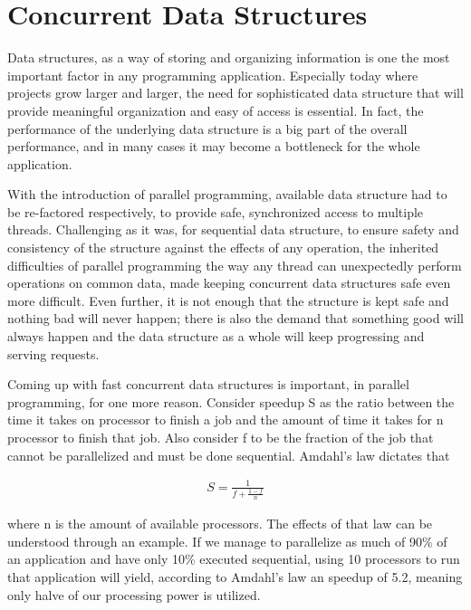 \section{Concurrent Data Structures}

Data structures, as a way of storing and organizing information is one the most important factor in any programming application. Especially today where projects grow larger and larger, the need for sophisticated data structure that will provide meaningful organization and easy of access is essential. In fact, the performance of the underlying data structure is a big part of the overall performance, and in many cases it may become a bottleneck for the whole application.

With the introduction of parallel programming,  available data structure had to be re-factored respectively, to provide safe, synchronized access to multiple threads. Challenging as it was, for sequential data structure, to ensure safety and consistency of the structure against the effects of any operation, the inherited difficulties of parallel programming the way any thread can unexpectedly perform operations on common data, made keeping concurrent data structures safe even more difficult. Even further, it is not enough that the structure is kept safe and nothing bad will never happen; there is also the demand that something good will always happen and the data structure as a whole will keep progressing and serving requests. 

Coming up with fast concurrent data structures is  important, in parallel programming, for one more reason. Consider speedup S as the ratio between the time it takes on processor to finish a job and the amount of time it takes for n processor to finish that job. Also consider f to be the fraction of the job  that cannot be parallelized and must be done sequential. Amdahl's law dictates that 

\begin{align*}
	S = \frac{1}{f + \frac{1-f}{n}}
\end{align*}

where n is the amount of available processors. The effects of that law can be understood through an example. If we manage to parallelize as much of 90\% of an application and have only 10\% executed sequential, using 10 processors to run that application will yield, according to Amdahl's law an speedup of 5.2, meaning only halve of our processing power is utilized. 

